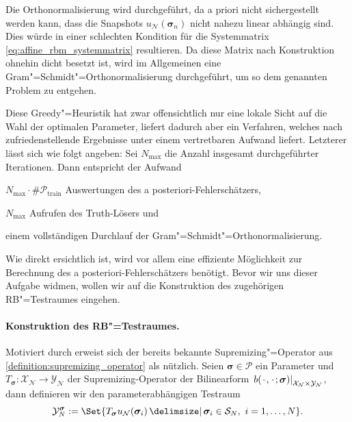 \documentclass[../main.tex]{subfiles}
\begin{document}
Die Orthonormalisierung wird durchgeführt, da a priori nicht sichergestellt werden kann, dass die Snapshots $u_{\mathcal N}(\bm \sigma_n)$ nicht nahezu linear abhängig sind.
Dies würde in einer schlechten Kondition für die Systemmatrix \cref{eq:affine_rbm_systemmatrix} resultieren.
Da diese Matrix nach Konstruktion ohnehin dicht besetzt ist, wird im Allgemeinen eine Gram"=Schmidt"=Orthonormalisierung durchgeführt, um so dem genannten Problem zu entgehen.

Diese Greedy"=Heuristik hat zwar offensichtlich nur eine lokale Sicht auf die Wahl der optimalen Parameter, liefert dadurch aber ein Verfahren, welches nach \cite[Subsection 3.4.3]{Patera:2007un} zufriedenstellende Ergebnisse unter einem vertretbaren Aufwand liefert.
Letzterer lässt sich wie folgt angeben: Sei $N_{\max}$ die Anzahl insgesamt durchgeführter Iterationen.
Dann entspricht der Aufwand
\begin{inlinelist}
    \item $N_{\max} \cdot \# \mathcal P_{\mathrm{train}}$ Auswertungen des a posteriori-Fehlerschätzers,
    \item $N_{\max}$ Aufrufen des Truth-Lösers und
    \item einem vollständigen Durchlauf der Gram"=Schmidt"=Orthonormalisierung.
\end{inlinelist}

Wie direkt ersichtlich ist, wird vor allem eine effiziente Möglichkeit zur Berechnung des a posteriori-Fehlerschätzers benötigt.
Bevor wir uns dieser Aufgabe widmen, wollen wir auf die Konstruktion des zugehörigen RB"=Testraumes eingehen.


\paragraph{Konstruktion des RB"=Testraumes.} %
\label{par:konstruktion_des_testraumes_}

Motiviert durch \cite{2014arXiv1408.2709M} erweist sich der bereits bekannte Supremizing"=Operator aus \cref{definition:supremizing_operator} als nützlich.
Seien $\bm \sigma \in \mathcal P$ ein Parameter und $T_{\bm \sigma} \colon \mathcal X_{\mathcal N} \to \mathcal Y_{\mathcal N}$ der Supremizing-Operator der Bilinearform $\left.b({\mkern2mu\cdot\mkern2mu}, {\mkern2mu\cdot\mkern2mu}; \bm \sigma)\right|_{\mathcal X_{\mathcal N} \times \mathcal Y_{\mathcal N}}$, dann definieren wir den parameterabhängigen Testraum
\begin{equation}\label{eq:rb_testraum_parameterabhaengig}
    \mathcal Y_{N}^{\bm \sigma} := \Set{ T_{\bm \sigma} u_{\mathcal N}(\bm \sigma_{i}) \given \bm \sigma_{i} \in \mathcal S_{N},~ i = 1, \dots, N }.
\end{equation}
\end{document}

